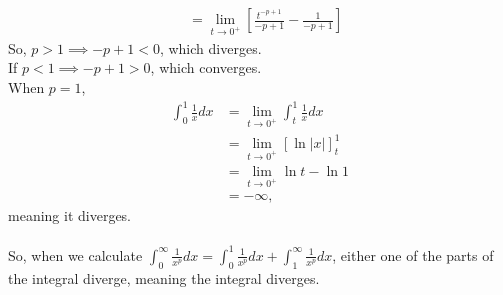 \documentclass{article}
\begin{document}
\begin{enumerate}
\begin{align*}
        & = \lim_{t\to0^+} \left[ \frac{t^{-p+1}}{-p+1} -  \frac{1}{-p+1}\right]
    \end{align*}
    So, $p > 1 \implies -p+1 < 0$, which diverges.\\
    If $p < 1 \implies -p+1 >0$, which converges.\\
    When $p = 1$, 
    \begin{align*}
        \int_0^1 \frac{1}{x} dx & = \lim_{t\to0^+} \int_t^1 \frac{1}{x} dx \\
        & = \lim_{t\to0^+} [\ln |x|]_t^1 \\
        & = \lim_{t\to0^+} \ln t - \ln 1 \\
        & = -\infty,
    \end{align*} meaning it diverges.\\
    \\
    So, when we calculate $\int_0^\infty \frac{1}{x^p} dx = \int_0^1 \frac{1}{x^p} dx + \int_1^\infty \frac{1}{x^p} dx$, either one of the parts of the integral diverge, meaning the integral diverges.
\end{enumerate}
\end{document}
